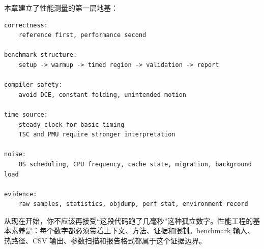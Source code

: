 本章建立了性能测量的第一层地基：

\begin{lstlisting}
correctness:
    reference first, performance second

benchmark structure:
    setup -> warmup -> timed region -> validation -> report

compiler safety:
    avoid DCE, constant folding, unintended motion

time source:
    steady_clock for basic timing
    TSC and PMU require stronger interpretation

noise:
    OS scheduling, CPU frequency, cache state, migration, background load

evidence:
    raw samples, statistics, objdump, perf stat, environment record
\end{lstlisting}

从现在开始，你不应该再接受“这段代码跑了几毫秒”这种孤立数字。性能工程的基本素养是：每个数字都必须带着上下文、方法、证据和限制。benchmark 输入、热路径、CSV 输出、参数扫描和报告格式都属于这个证据边界。
